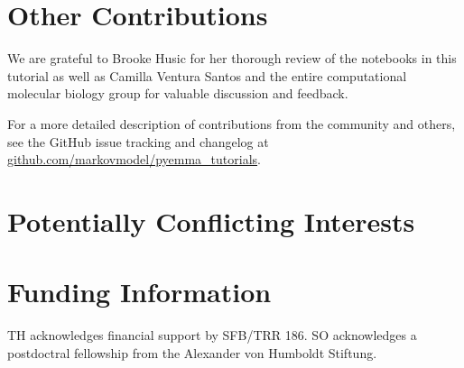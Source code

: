 \documentclass[9pt,tutorial]{livecoms}
\newcommand{\githubrepository}{\url{github.com/markovmodel/pyemma_tutorials}}
\begin{document}
\section{Other Contributions}
%
We are grateful to Brooke Husic for her thorough review of the notebooks in this tutorial as well as Camilla Ventura Santos and the entire computational molecular biology group for valuable discussion and feedback.

For a more detailed description of contributions from the community and others, see the GitHub issue tracking and changelog at \githubrepository{}.

\section{Potentially Conflicting Interests}

\section{Funding Information}
TH acknowledges financial support by SFB/TRR 186. SO acknowledges a postdoctral fellowship from the Alexander von Humboldt Stiftung.




\end{document}
